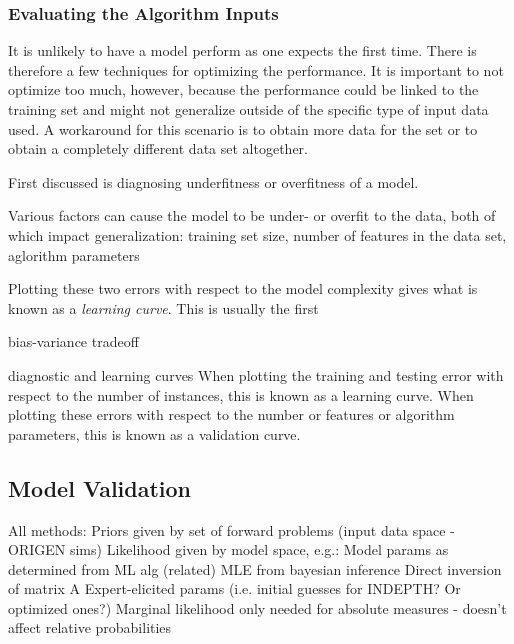 \subsubsection{Evaluating the Algorithm Inputs}
\label{sec:inputs}

It is unlikely to have a model perform as one expects the first time. There is
therefore a few techniques for optimizing the performance. It is important to
not optimize too much, however, because the performance could be linked to the
training set and might not generalize outside of the specific type of input
data used.  A workaround for this scenario is to obtain more data for the set
or to obtain a completely different data set altogether. 

First discussed is diagnosing underfitness or overfitness of a model. 

Various
factors can cause the model to be under- or overfit to the data, both of which
impact generalization: training set size, number of features in the data set,
aglorithm parameters


Plotting these two errors with respect to the model complexity gives what is known as 
a \textit{learning curve}. This is usually the first

bias-variance tradeoff

diagnostic and learning curves
When plotting the training and testing error
with respect to the number of instances, this is known as a learning curve.
When plotting these errors with respect to the number or features or algorithm
parameters, this is known as a validation curve. 

\subsection{Model Validation}
\label{sec:validation}


All methods:
Priors given by set of forward problems (input data space - ORIGEN sims)
Likelihood given by model space, e.g.: 
Model params as determined from ML alg
(related) MLE from bayesian inference
Direct inversion of matrix A
Expert-elicited params (i.e. initial guesses for INDEPTH? Or optimized ones?)
Marginal likelihood only needed for absolute measures - doesn’t affect relative probabilities

